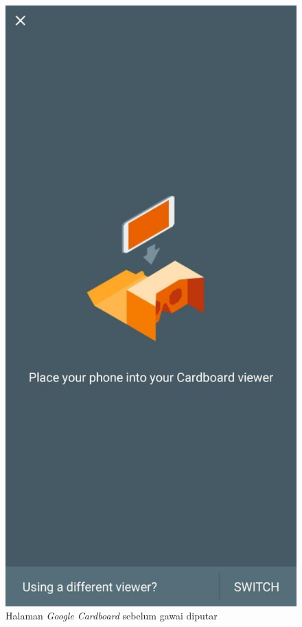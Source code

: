 \begin{figure}[h]
	\centering
		\includegraphics[scale=0.4]{Gambar/cardboard-page.png}
	\caption{Halaman \textit{Google Cardboard} sebelum gawai diputar}
	\label{fig:cardboard-page}
\end{figure}

